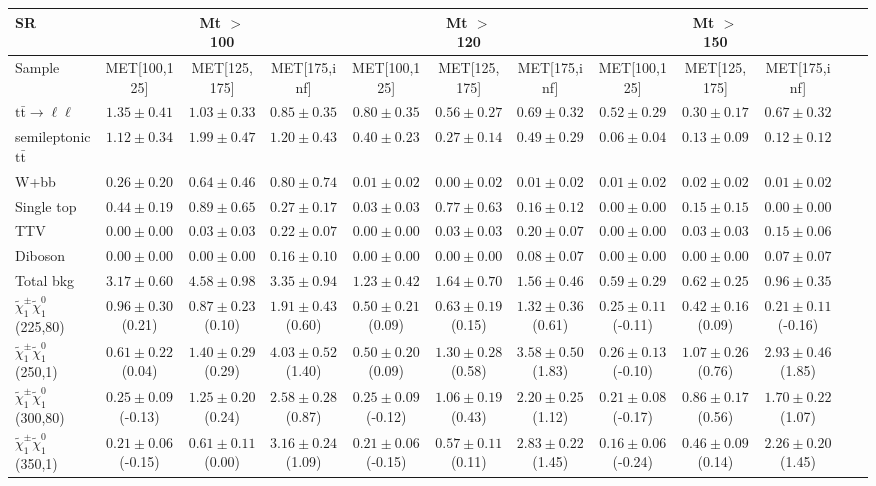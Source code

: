 \begin{table}
\begin{center}
\small
\begin{tabular}{lccccccccccc}
\hline
SR & & Mt $>$ 100 & & & Mt $>$ 120 & & &Mt $>$ 150 & & &\\
\hline
Sample&MET[100,125]&MET[125,175]&MET[175,inf]&MET[100,125]&MET[125,175]&MET[175,inf]&MET[100,125]&MET[125,175]&MET[175,inf]&\\
\hline
$\mathrm{t}\bar{\mathrm{t}}\rightarrow \ell\ell$&$1.35\pm0.41$&$1.03\pm0.33$&$0.85\pm0.35$&$0.80\pm0.35$&$0.56\pm0.27$&$0.69\pm0.32$&$0.52\pm0.29$&$0.30\pm0.17$&$0.67\pm0.32$\\
semileptonic $\mathrm{t}\bar{\mathrm{t}}$&$1.12\pm0.34$&$1.99\pm0.47$&$1.20\pm0.43$&$0.40\pm0.23$&$0.27\pm0.14$&$0.49\pm0.29$&$0.06\pm0.04$&$0.13\pm0.09$&$0.12\pm0.12$\\
W+bb&$0.26\pm0.20$&$0.64\pm0.46$&$0.80\pm0.74$&$0.01\pm0.02$&$0.00\pm0.02$&$0.01\pm0.02$&$0.01\pm0.02$&$0.02\pm0.02$&$0.01\pm0.02$\\
Single top&$0.44\pm0.19$&$0.89\pm0.65$&$0.27\pm0.17$&$0.03\pm0.03$&$0.77\pm0.63$&$0.16\pm0.12$&$0.00\pm0.00$&$0.15\pm0.15$&$0.00\pm0.00$\\
TTV&$0.00\pm0.00$&$0.03\pm0.03$&$0.22\pm0.07$&$0.00\pm0.00$&$0.03\pm0.03$&$0.20\pm0.07$&$0.00\pm0.00$&$0.03\pm0.03$&$0.15\pm0.06$\\
Diboson&$0.00\pm0.00$&$0.00\pm0.00$&$0.16\pm0.10$&$0.00\pm0.00$&$0.00\pm0.00$&$0.08\pm0.07$&$0.00\pm0.00$&$0.00\pm0.00$&$0.07\pm0.07$\\
\hline
Total bkg&$3.17\pm0.60$&$4.58\pm0.98$&$3.35\pm0.94$&$1.23\pm0.42$&$1.64\pm0.70$&$1.56\pm0.46$&$0.59\pm0.29$&$0.62\pm0.25$&$0.96\pm0.35$\\
$\tilde{\chi}_{1}^{\pm}\tilde{\chi}_{1}^{0}$ (225,80)&$0.96\pm0.30$(0.21)&$0.87\pm0.23$(0.10)&$1.91\pm0.43$(0.60)&$0.50\pm0.21$(0.09)&$0.63\pm0.19$(0.15)&$1.32\pm0.36$(0.61)&$0.25\pm0.11$(-0.11)&$0.42\pm0.16$(0.09)&$0.21\pm0.11$(-0.16)\\
$\tilde{\chi}_{1}^{\pm}\tilde{\chi}_{1}^{0}$ (250,1)&$0.61\pm0.22$(0.04)&$1.40\pm0.29$(0.29)&$4.03\pm0.52$(1.40)&$0.50\pm0.20$(0.09)&$1.30\pm0.28$(0.58)&$3.58\pm0.50$(1.83)&$0.26\pm0.13$(-0.10)&$1.07\pm0.26$(0.76)&$2.93\pm0.46$(1.85)\\
$\tilde{\chi}_{1}^{\pm}\tilde{\chi}_{1}^{0}$ (300,80)&$0.25\pm0.09$(-0.13)&$1.25\pm0.20$(0.24)&$2.58\pm0.28$(0.87)&$0.25\pm0.09$(-0.12)&$1.06\pm0.19$(0.43)&$2.20\pm0.25$(1.12)&$0.21\pm0.08$(-0.17)&$0.86\pm0.17$(0.56)&$1.70\pm0.22$(1.07)\\
$\tilde{\chi}_{1}^{\pm}\tilde{\chi}_{1}^{0}$ (350,1)&$0.21\pm0.06$(-0.15)&$0.61\pm0.11$(0.00)&$3.16\pm0.24$(1.09)&$0.21\pm0.06$(-0.15)&$0.57\pm0.11$(0.11)&$2.83\pm0.22$(1.45)&$0.16\pm0.06$(-0.24)&$0.46\pm0.09$(0.14)&$2.26\pm0.20$(1.45)\\
\hline
\hline\hline
\end{tabular}
\end{center}
\end{table}
